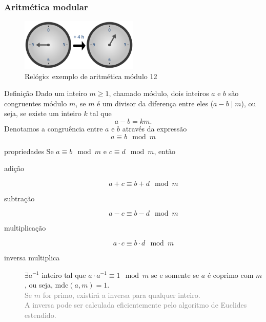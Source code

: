 \documentclass[portuguese,aspectratio=169]{beamer}
\begin{document}
\begin{frame}[allowframebreaks]
\frametitle{Aritmética modular}

\begin{figure}
  \centering
  \includegraphics[width=0.5\textwidth]{clock_group.png}
  \caption{Relógio: exemplo de aritmética módulo 12}\label{fig-clockgroup}
\end{figure}

\begin{block}{Definição}
Dado um inteiro $m \geq 1$, chamado módulo, dois inteiros $a$ e $b$ são congruentes módulo $m$, se $m$ é um divisor da diferença entre eles ($a-b \mid m$), ou seja,
se existe um inteiro $k$ tal que
\begin{equation}
  a - b = k m.
\end{equation}
Denotamos a congruência entre $a$ e $b$ através da expressão
\begin{equation}
  a \equiv b \mod m
\end{equation}
\end{block}

\begin{block}{propriedades}
Se $a \equiv b \mod m$ e $c \equiv d \mod m$, então
\begin{description}
  \item[adição]
    \begin{equation}
      a + c \equiv b + d \mod m
    \end{equation}
  \item[subtração]
    \begin{equation}
      a - c \equiv b - d \mod m
    \end{equation}
  \item[multiplicação]
    \begin{equation}
      a \cdot c \equiv b \cdot d \mod m
    \end{equation}
  \item[inversa multiplica] $\exists a^{-1}$ inteiro tal que $a \cdot a^{-1} \equiv 1 \mod m$ se e somente se 
    $a$ é coprimo com $m$, ou seja, $\text{mdc}(a,m) = 1$. \\
    \textcolor{gray}{Se $m$ for primo, existirá a inversa para qualquer inteiro.} \\
    \textcolor{gray}{A inversa pode ser calculada eficientemente pelo algoritmo de Euclides estendido.}
\end{description}
\end{block}


\end{frame}
\end{document}

